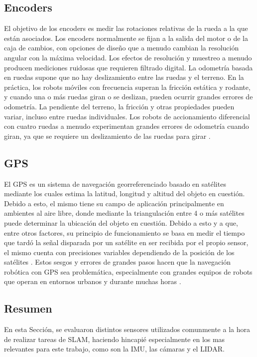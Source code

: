 \subsection{Encoders}
El objetivo de los encoders es medir las rotaciones relativas de la rueda a la que están asociados. Los encoders normalmente se fijan a la salida del motor o de la caja de cambios, con opciones de diseño que a menudo cambian la resolución angular con la máxima velocidad. Los efectos de resolución y muestreo a menudo producen mediciones ruidosas que requieren filtrado digital. La odometría basada en ruedas supone que no hay deslizamiento entre las ruedas y el terreno. En la práctica, los robots móviles con frecuencia superan la fricción estática y rodante, y cuando una o más ruedas giran o se deslizan, pueden ocurrir grandes errores de odometría. La pendiente del terreno, la fricción y otras propiedades pueden variar, incluso entre ruedas individuales. Los robots de accionamiento diferencial con cuatro ruedas a menudo experimentan grandes errores de odometría cuando giran, ya que se requiere un deslizamiento de las ruedas para girar \cite{dudek2010}.

\subsection{GPS}
El GPS es un sistema de navegación georreferenciado basado en satélites mediante los cuales estima la latitud, longitud y altitud del objeto en cuestión. Debido a esto, el mismo tiene su campo de aplicación principalmente en ambientes al aire libre, donde mediante la triangulación entre 4 o más satélites puede determinar la ubicación del objeto en cuestión. Debido a esto y a que, entre otros factores, su principio de funcionamiento se basa en medir el tiempo que tardó la señal disparada por un satélite en ser recibida por el propio sensor, el mismo cuenta con precisiones variables dependiendo de la posición de los satélites \cite{elrabbany2002}. Estos sesgos y errores de grandes pasos hacen que la navegación robótica con GPS sea problemática, especialmente con grandes equipos de robots que operan en entornos urbanos y durante muchas horas \cite{carlson2010}.

\subsection{Resumen}
En esta Sección, se evaluaron distintos sensores utilizados comunmente a la hora de realizar tareas de SLAM, haciendo hincapié especialmente en los mas relevantes para este trabajo, como son la IMU, las cámaras y el LIDAR.
